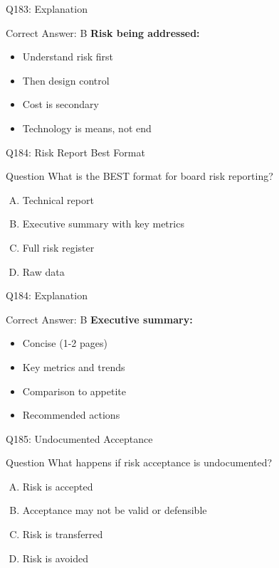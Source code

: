 \documentclass{beamer}
\begin{document}
	\begin{frame}{Q183: Explanation}
		\begin{block}{Correct Answer: B}
			\textbf{Risk being addressed:}
			\begin{itemize}
				\item Understand risk first
				\item Then design control
				\item Cost is secondary
				\item Technology is means, not end
			\end{itemize}
		\end{block}
	\end{frame}
	
	\begin{frame}{Q184: Risk Report Best Format}
		\begin{block}{Question}
			What is the BEST format for board risk reporting?
		\end{block}
		\begin{enumerate}[(A)]
			\item Technical report
			\item Executive summary with key metrics
			\item Full risk register
			\item Raw data
		\end{enumerate}
	\end{frame}
	
	\begin{frame}{Q184: Explanation}
		\begin{block}{Correct Answer: B}
			\textbf{Executive summary:}
			\begin{itemize}
				\item Concise (1-2 pages)
				\item Key metrics and trends
				\item Comparison to appetite
				\item Recommended actions
			\end{itemize}
		\end{block}
	\end{frame}
	
	\begin{frame}{Q185: Undocumented Acceptance}
		\begin{block}{Question}
			What happens if risk acceptance is undocumented?
		\end{block}
		\begin{enumerate}[(A)]
			\item Risk is accepted
			\item Acceptance may not be valid or defensible
			\item Risk is transferred
			\item Risk is avoided
		\end{enumerate}
	\end{frame}
	
\end{document}
